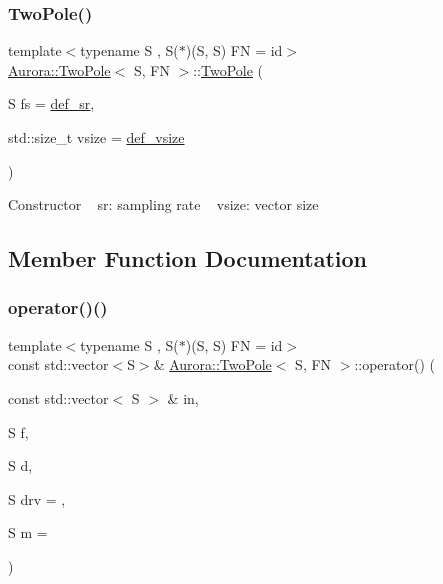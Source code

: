 \subsubsection{\texorpdfstring{Two\+Pole()}{TwoPole()}}
{\footnotesize\ttfamily template$<$typename S , S($\ast$)(\+S, S) FN = id$>$ \\
\hyperlink{class_aurora_1_1_two_pole}{Aurora\+::\+Two\+Pole}$<$ S, FN $>$\+::\hyperlink{class_aurora_1_1_two_pole}{Two\+Pole} (\begin{DoxyParamCaption}\item[{S}]{fs = {\ttfamily \hyperlink{namespace_aurora_ad49263d809bea98dd422e95bc91bc03e}{def\+\_\+sr}},  }\item[{std\+::size\+\_\+t}]{vsize = {\ttfamily \hyperlink{namespace_aurora_afaaddf667a06e7ce23c667a8b7295263}{def\+\_\+vsize}} }\end{DoxyParamCaption})\hspace{0.3cm}{\ttfamily [inline]}}

Constructor ~\newline
sr\+: sampling rate ~\newline
vsize\+: vector size 

\subsection{Member Function Documentation}
\mbox{\label{class_aurora_1_1_two_pole_a1dc2162d26dbb9215d2c31eaee2cea2f}} 
\subsubsection{\texorpdfstring{operator()()}{operator()()}\hspace{0.1cm}{\footnotesize\ttfamily [1/2]}}
{\footnotesize\ttfamily template$<$typename S , S($\ast$)(\+S, S) FN = id$>$ \\
const std\+::vector$<$S$>$\& \hyperlink{class_aurora_1_1_two_pole}{Aurora\+::\+Two\+Pole}$<$ S, FN $>$\+::operator() (\begin{DoxyParamCaption}\item[{const std\+::vector$<$ S $>$ \&}]{in,  }\item[{S}]{f,  }\item[{S}]{d,  }\item[{S}]{drv = {},  }\item[{S}]{m = {} }\end{DoxyParamCaption})\hspace{0.3cm}{\ttfamily [inline]}}

